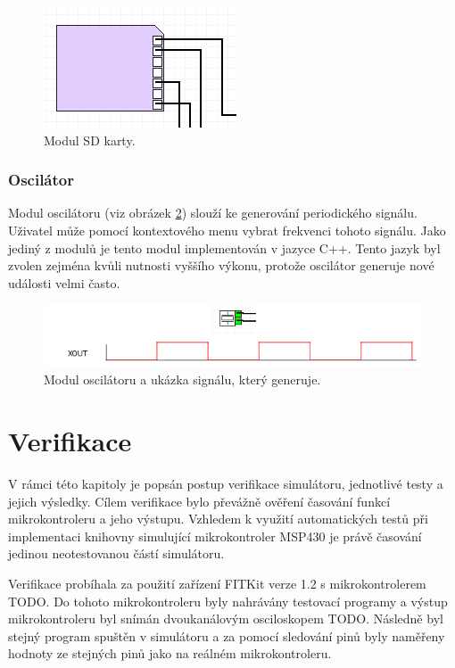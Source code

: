 \begin{figure}[ht]
\centering
\includegraphics[trim=0cm 0cm 0cm 0cm, scale=1]{fig/sd}
\caption{Modul SD karty.}
\label{fig:sd}
\end{figure}

\subsection{Oscilátor}

Modul oscilátoru (viz obrázek \ref{fig:oscilator}) slouží ke generování periodického signálu. Uživatel může pomocí kontextového menu vybrat frekvenci tohoto signálu. Jako jediný z modulů je tento modul implementován v jazyce C++. Tento jazyk byl zvolen zejména kvůli nutnosti vyššího výkonu, protože oscilátor generuje nové události velmi často.

\begin{figure}[ht]
\centering
\includegraphics[trim=0cm 0cm 0cm 0cm, scale=0.8]{fig/oscilator}
\caption{Modul oscilátoru a ukázka signálu, který generuje.}
\label{fig:oscilator}
\end{figure}

\chapter{Verifikace}

V rámci této kapitoly je popsán postup verifikace simulátoru, jednotlivé testy a jejich výsledky. Cílem verifikace bylo převážně ověření časování funkcí mikrokontroleru a jeho výstupu. Vzhledem k využití automatických testů při implementaci knihovny simulující mikrokontroler MSP430 je právě časování jedinou neotestovanou částí simulátoru.

Verifikace probíhala za použití zařízení FITKit verze 1.2 s mikrokontrolerem TODO. Do tohoto mikrokontroleru byly nahrávány testovací programy a výstup mikrokontroleru byl snímán dvoukanálovým osciloskopem TODO. Následně byl stejný program spuštěn v simulátoru a za pomocí sledování pinů byly naměřeny hodnoty ze stejných pinů jako na reálném mikrokontroleru.

